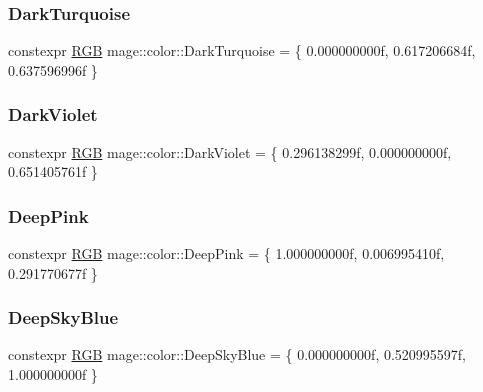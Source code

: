 \mbox{\label{namespacemage_1_1color_a4717affd7c87b2f89b9e461b16510f56}} 
\subsubsection{\texorpdfstring{Dark\+Turquoise}{DarkTurquoise}}
{\footnotesize\ttfamily constexpr \mbox{\hyperlink{structmage_1_1_r_g_b}{R\+GB}} mage\+::color\+::\+Dark\+Turquoise = \{ 0.\+000000000f, 0.\+617206684f, 0.\+637596996f \}}

\mbox{\label{namespacemage_1_1color_adb191fa4601ac336db967a8ec301370f}} 
\subsubsection{\texorpdfstring{Dark\+Violet}{DarkViolet}}
{\footnotesize\ttfamily constexpr \mbox{\hyperlink{structmage_1_1_r_g_b}{R\+GB}} mage\+::color\+::\+Dark\+Violet = \{ 0.\+296138299f, 0.\+000000000f, 0.\+651405761f \}}

\mbox{\label{namespacemage_1_1color_aa68a1c007257021aa438e5ad8251e0b1}} 
\subsubsection{\texorpdfstring{Deep\+Pink}{DeepPink}}
{\footnotesize\ttfamily constexpr \mbox{\hyperlink{structmage_1_1_r_g_b}{R\+GB}} mage\+::color\+::\+Deep\+Pink = \{ 1.\+000000000f, 0.\+006995410f, 0.\+291770677f \}}

\mbox{\label{namespacemage_1_1color_a6a122d439d2206202dc3078cf8bb645f}} 
\subsubsection{\texorpdfstring{Deep\+Sky\+Blue}{DeepSkyBlue}}
{\footnotesize\ttfamily constexpr \mbox{\hyperlink{structmage_1_1_r_g_b}{R\+GB}} mage\+::color\+::\+Deep\+Sky\+Blue = \{ 0.\+000000000f, 0.\+520995597f, 1.\+000000000f \}}

